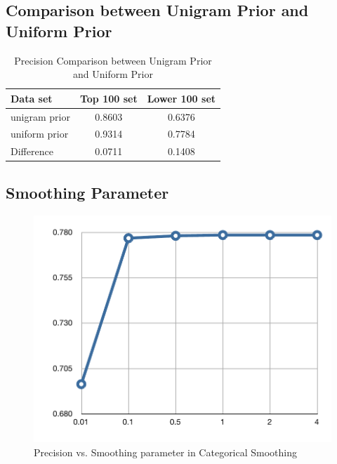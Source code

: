\subsection{Comparison between Unigram Prior and Uniform Prior}

\begin{table}[t]
\caption{Precision Comparison between Unigram Prior and Uniform Prior}
\label{tab-prior-comparison}
\vskip 0.15in
\begin{center}
\begin{small}
\begin{sc}
\begin{tabular}{l|cc}
\hline
\abovespace \belowspace
Data set & Top 100 set & Lower 100 set \\
\hline
\abovespace
unigram prior & 0.8603 & 0.6376 \\
\belowspace
uniform prior & 0.9314 & 0.7784 \\
\hline
\abovespace
\belowspace
Difference & 0.0711 & 0.1408 \\
\hline
\end{tabular}
\end{sc}
\end{small}
\end{center}
\vskip -0.1in
\end{table}

\subsection{Smoothing Parameter}

\begin{figure}[ht]
\vskip 0.2in
\begin{center}
\centerline{\includegraphics[width=\columnwidth]{pvsalpha}}
\caption{Precision vs. Smoothing parameter in Categorical Smoothing}
\label{fig-p-vs-alpha}
\end{center}
\vskip -0.2in
\end{figure}

